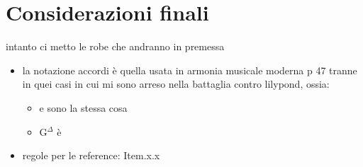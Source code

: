\documentclass[class=book, crop=false, oneside, 12pt]{standalone}
\begin{document}
\chapter*{Considerazioni finali}

intanto ci metto le robe che andranno in premessa

\begin{itemize}
    \item la notazione accordi è quella usata in armonia musicale moderna p 47 tranne in quei casi in cui mi sono arreso nella battaglia contro lilypond, ossia:
    \begin{itemize}
        \item {} e  sono la stessa cosa
        \item G\(^\Delta\) è 
    \end{itemize}
    \item regole per le reference: Item.x.x
\end{itemize}
\end{document}
